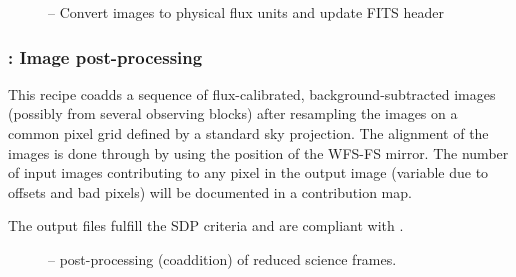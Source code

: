 

\begin{figure}[hb]
  \centering
  \def \globalscale {0.700000}
  \fontsize{10}{12}\selectfont
  
  \caption[Recipe: ]{ --
    Convert images to physical flux units and update FITS header}
  \label{fig:metis_lm_img_calibrate}
\end{figure}


\clearpage
\subsubsection{:  Image post-processing}
\label{lm_img_postprocess}
\label{rec:lm_img_postprocess}
\label{sssec:lm_img_postprocess}
\label{rec:metis_lm_img_sci_postprocess}

This recipe coadds a sequence of flux-calibrated,
background-subtracted images (possibly from several observing blocks)
after resampling the images on a common pixel grid defined by a
standard sky projection.
The alignment of the images is done through by using the position of the \ac{WFS-FS} mirror.
The number of input
images contributing to any pixel in the output image (variable due to
offsets and bad pixels) will be documented in a contribution
map.

The output files fulfill the \ac{SDP} criteria and are compliant with .



\begin{figure}[hb]
    \centering
    \def \globalscale {0.700000}
    \fontsize{10}{12}\selectfont
    
  \caption[Recipe: ]{%
     -- post-processing (coaddition)
    of reduced  science frames.}
  \label{fig:metis_lm_img_sci_postprocess}
\end{figure}

